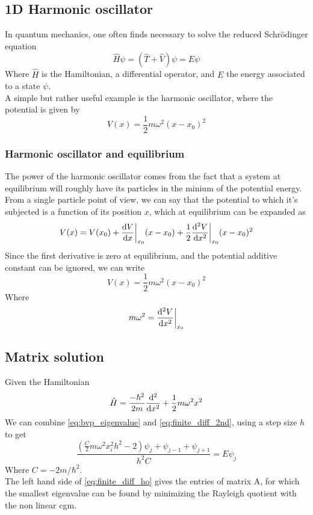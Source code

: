 \documentclass{article}
\begin{document}
\subsection{1D Harmonic oscillator}
In quantum mechanics, one often finds necessary to solve the reduced Schrödinger equation
\begin{equation}
    \hat H \psi = (\hat T + \hat V)\psi =E\psi 
\end{equation}
Where $\hat H$ is the Hamiltonian, a differential operator, and $E$ the energy associated to a state $\psi$.
\\A simple but rather useful example is the harmonic oscillator, where the potential is given by
\begin{equation}
    V(x) = \frac{1}{2}m\omega^2(x-x_0)^2
\end{equation}
\subsubsection{Harmonic oscillator and equilibrium}
The power of the harmonic oscillator comes from the fact that a system at equilibrium will roughly have its particles in the minium of the potential energy.
\\From a single particle point of view, we can say that the potential to which it's subjected is a function of its position $x$, which at equilibrium can be expanded as
\begin{equation}
    V(x) = V(x_0) + \dv{V}{x}\bigg|_{x_0}(x-x_0)+ \frac 1 2 \dv[2]{V}{x}\bigg|_{x_0}(x-x_0)^2
\end{equation}
Since the first derivative is zero at equilibrium, and the potential additive constant can be ignored, we can write
\begin{equation}
    V(x) = \frac{1}{2}m\omega^2(x-x_0)^2
\end{equation}
Where 
\begin{equation}
    m\omega^2 = \dv[2]{V}{x}\bigg|_{x_0}
\end{equation}

\subsection{Matrix solution}
Given the Hamiltonian
\begin{equation}
    \hat H = \frac{-\hbar^2}{2m}\dv[2]{}{x}+\frac 1 2 m \omega^2 x^2
\end{equation}
We can combine \ref{eq:bvp_eigenvalue} and \ref{eq:finite_diff_2nd}, using a step size $h$ to get
\begin{equation}
    \frac{(\frac C 2 m\omega^2 x_i^2 h ^2 - 2)\psi_j + \psi_{j-1} + \psi_{j+1}}{h ^2 C} = E\psi_j \label{eq:finite_diff_ho}
\end{equation}
Where $C = {-2m}/{\hbar^2}$.
\\The left hand side of \ref{eq:finite_diff_ho} gives the entries of matrix A, for which the smallest eigenvalue can be found by minimizing the Rayleigh quotient with the non linear cgm.
\end{document}
